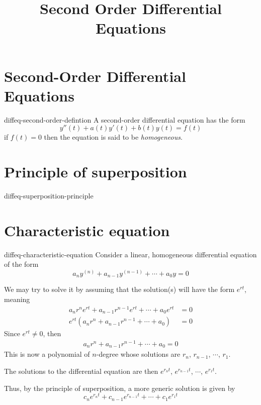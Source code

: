 \documentclass[preview]{standalone}
\begin{document}
\title{Second Order Differential Equations}
\genpage

\section{Second-Order Differential Equations}

\begin{snippet}{diffeq-second-order-defintion}
A second-order differential equation has the form
\[
    y''(t)+a(t)y'(t)+b(t)y(t)=f(t)
\]
if \(f(t)=0\) then the equation is said to be \textit{homogeneous}.
\end{snippet}

\section{Principle of superposition}

\begin{snippet}{diffeq-superposition-principle}
\end{snippet}

\section{Characteristic equation}

\begin{snippet}{diffeq-characteristic-equation}
Consider a linear, homogeneous differential equation of the form
\[
    a_n y^{(n)} + a_{n-1} y^{(n-1)} + \cdots + a_0y = 0
\]

We may try to solve it by assuming that the solution(s) will have the form \(e^{rt}\),
meaning
\begin{align*}
    a_n r^n e^{rt}
    + a_{n-1} r^{n-1} e^{rt} + \cdots + a_0 e^{rt} & = 0 \\
    e^{rt} \left(
        a_n r^n + a_{n-1} r^{n-1} + \cdots + a_0
    \right) &= 0
\end{align*}
Since \(e^{rt} \neq 0\), then
\begin{align*}
    a_n r^n + a_{n-1} r^{n-1} + \cdots + a_0 = 0
\end{align*}
This is now a polynomial of \(n\)-degree whose solutions are
\(r_n\), \(r_{n-1}\), \(\cdots\), \(r_1\).

The solutions to the differential equation are then \(e^{r_n t}\),
\(e^{r_{n-1}t}\), \(\cdots\), \(e^{r_1 t}\).

Thus, by the principle of superposition, a more generic solution is given by
\[
    c_n e^{r_n t} +
    c_{n-1} e^{r_{n-1}t} +
    \cdots +
    c_1 e^{r_1 t}
\]
\end{snippet}

\end{document}
